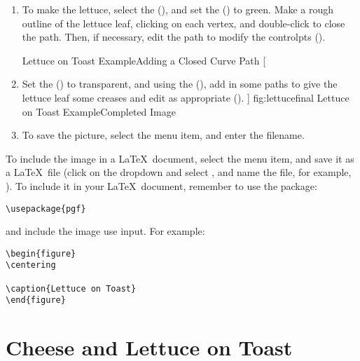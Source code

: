 \begin{enumerate}
[]
{
 {fig:lettuce4a}{}{},
 {fig:lettuce4b}{}{}
}
[Lettuce on Toast Example\dash Finish Editing the Curve]
{Lettuce on Toast Example\dash finish editing the curve:
 changing the curvature by moving the control points;
 exit edit path mode.}

\item To make the lettuce, select the 
(), and set the 
() to green.  Make a rough outline of the
lettuce leaf, clicking on each vertex, and double-click to close the
path. Then, if necessary, edit the path to modify the
\glspl{controlpt} ().

{}
{Lettuce on Toast Example\dash Adding a Closed Curve Path}
[
  \item Set the  () to
  \gls{transparent}, and using the 
  (), add in some \glspl{path} to give
  the lettuce leaf some creases and edit as appropriate
  ().
]
{fig:lettucefinal}
{}
{Lettuce on Toast Example\dash Completed Image}

\item To save the picture, select the 
menu item, and enter the filename.

\end{enumerate}

To include the image in a \LaTeX\ document, select the
 menu item, and save it as a
\LaTeX\ file (click on the  \gls{dropdown} and
select , and name the file,
for example, ).
To include it in your \LaTeX\ document, remember to use the
 package:
\begin{verbatim}
\usepackage{pgf}
\end{verbatim}
and include the image use \gls{input}. For example:
\begin{verbatim}
\begin{figure}
\centering

\caption{Lettuce on Toast}
\end{figure}
\end{verbatim}

\section{Cheese and Lettuce on Toast}\label{sec:cheeseexample}

